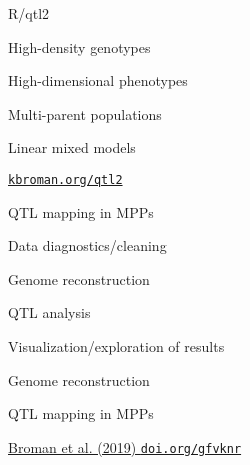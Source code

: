 \documentclass[12pt,t,aspectratio=169]{beamer}
\begin{document}
\begin{frame}[c]{R/qtl2}

\vspace*{-16.2mm}

  \vspace{21mm}

  \bbi
\item High-density genotypes
\item High-dimensional phenotypes
\item Multi-parent populations
\item Linear mixed models
  \ei

  \vspace{25mm}

\hfill \href{https://kbroman.org/qtl2}{\small \tt kbroman.org/qtl2}

\end{frame}



\begin{frame}{QTL mapping in MPPs}

  \bbi
\item Data diagnostics/cleaning
\item Genome reconstruction
\item QTL analysis
\item Visualization/exploration of results
  \ei

\end{frame}


\begin{frame}[c]{Genome reconstruction}


\end{frame}




\begin{frame}[c]{QTL mapping in MPPs}

  \bigskip



\hfill
\href{https://doi.org/10.1534/genetics.118.301595}{\scriptsize
  \lolit Broman et al. (2019) {\tt doi.org/gfvknr}}

\end{frame}
\end{document}
